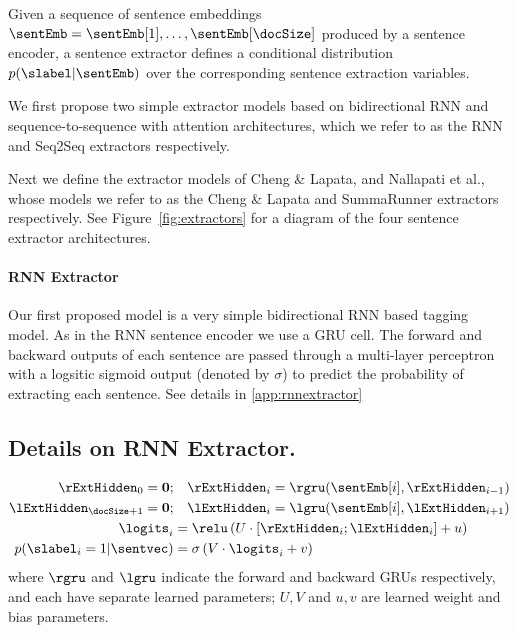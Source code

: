 Given a sequence of sentence embeddings $\sentEmb = \sentEmb[1], \ldots, \sentEmb[\docSize]$ produced by a sentence encoder, 
a sentence extractor defines a conditional distribution $p(\slabel|\sentEmb)$
over the corresponding sentence extraction variables.

We first propose two simple extractor models based on bidirectional RNN 
and sequence-to-sequence with attention architectures, 
which we refer to as the RNN and 
Seq2Seq extractors respectively.

Next we define the extractor models of Cheng \& Lapata, and Nallapati et al.,
whose models we refer to as the Cheng \& Lapata and SummaRunner extractors
respectively.
See Figure~\ref{fig:extractors} for a diagram of the 
four sentence extractor architectures.




\paragraph{RNN Extractor}
    Our first proposed model is a very simple bidirectional
RNN based tagging model. As in the RNN sentence encoder we use a GRU cell.
The  forward and backward outputs of each sentence are passed through a 
multi-layer perceptron with a logsitic sigmoid output (denoted by $\sigma$)
to predict the probability
of extracting each sentence. See details in \autoref{app:rnnextractor}

\begin{toappendix}
\section{Details on RNN Extractor.} \label{app:rnnextractor}
\begin{align}
    \rExtHidden_0 = \mathbf{0};&\quad   \rExtHidden_i = \rgru(\sentEmb[i], \rExtHidden_{i-1}) \\
    \lExtHidden_{\docSize + 1} = \mathbf{0};&\quad    \lExtHidden_i = \lgru(\sentEmb[i], \lExtHidden_{i+1}) \\
   \logits_i &= \relu\left(U \cdot [\rExtHidden_i; \lExtHidden_i] + u \right)\\
   p(\slabel_i=1|\sentvec) &= \sigma\left(V\cdot \logits_i + v  \right)
\end{align}
where $\rgru$ and $\lgru$ indicate the 
forward and backward GRUs respectively, and each have separate learned 
parameters; $U, V$ and $u, v$ are learned weight and bias parameters.
\end{toappendix}

